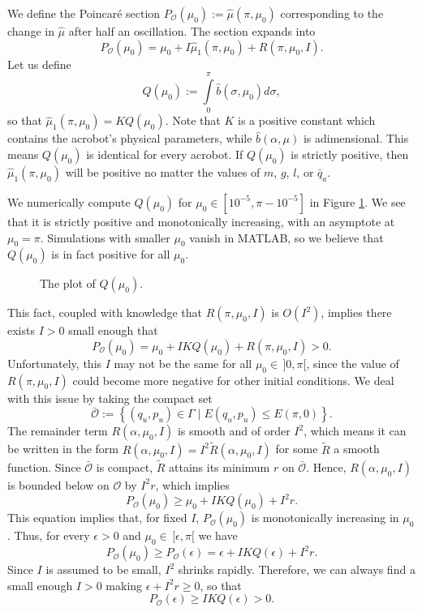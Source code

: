 We define the Poincar\'{e} section 
\(P_\mathcal{O}(\mu_0) := \hat{\mu}(\pi,\mu_0)\)
corresponding to the change in \(\hat{\mu}\) after half an oscillation.
The section expands into
\[
    P_\mathcal{O}(\mu_0) = \mu_0 + I \hat{\mu}_1(\pi,\mu_0) + R(\pi,\mu_0,I)
    .
\]
Let us define
\[
    Q(\mu_0) := \int \limits_0^\pi \hat{b}(\sigma,\mu_0)d\sigma
    ,
\]
so that \(\hat{\mu}_1(\pi,\mu_0) = K Q(\mu_0)\).
Note that \(K\) is a positive constant which contains the acrobot's physical
parameters, while \(\hat{b}(\alpha,\mu)\) is adimensional. 
This means \(Q(\mu_0)\) is identical for every acrobot.
If \(Q(\mu_0)\) is strictly positive, then \(\hat{\mu}_1(\pi,\mu_0)\) will be
positive no matter the values of \(m\), \(g\), \(l\), or \(\bar{q}_a\).

We numerically compute \(Q(\mu_0)\) for \(\mu_0 \in [10^{-5}, \pi - 10^{-5}]\)
in Figure \ref{fig:acrobot-Q}. 
We see that it is strictly positive and monotonically increasing, with
an asymptote at \(\mu_0 = \pi\). 
Simulations with smaller \(\mu_0\) vanish in MATLAB, so we believe that 
\(Q(\mu_0)\) is in fact positive for all \(\mu_0\).

\begin{figure}
    \centering
    \caption{The plot of \(Q(\mu_0)\).}
    \label{fig:acrobot-Q}
\end{figure}

This fact, coupled with knowledge that \(R(\pi,\mu_0,I)\) is \(O(I^2)\), 
implies there exists \(I > 0\) small enough that
\[
    P_\mathcal{O}(\mu_0) = \mu_0 + IKQ(\mu_0) + R(\pi,\mu_0,I) > 0
    .
\]
Unfortunately, this \(I\) may not be the
same for all \(\mu_0 \in \, ]0,\pi[\), since
the value of \(R(\pi,\mu_0,I)\) could become more negative
for other initial conditions.
We deal with this issue by taking the compact set
\[
    \bar{\mathcal{O}} := \left\{(q_u,p_u) \in \Gamma 
    \mid E(q_u,p_u) \leq E(\pi,0) \right\}
    .
\]
The remainder term \(R(\alpha,\mu_0,I)\) is smooth and of order \(I^2\),
which means it can be written in the form 
\(R(\alpha,\mu_0,I) = I^2\tilde{R}(\alpha,\mu_0,I)\)
for some \(\tilde{R}\) a smooth function.
Since \(\bar{\mathcal{O}}\) is compact, \(\tilde{R}\) attains its minimum
\({r}\) on \(\bar{\mathcal{O}}\).
Hence, \(R(\alpha,\mu_0,I)\) is bounded below on \(\mathcal{O}\) by
\(I^2{r}\), which implies 
\begin{equation}\label{eqn:acrobot-Po-lowerbound}
    P_\mathcal{O}(\mu_0) \geq \mu_0 + IKQ(\mu_0) + I^2{r}
    .
\end{equation}
This equation implies that, for fixed \(I\),
\(P_\mathcal{O}(\mu_0)\) is monotonically increasing in \(\mu_0\).
Thus, for every \(\epsilon > 0\) and \(\mu_0 \in \, [\epsilon,\pi[\) we have
\[
    P_\mathcal{O}(\mu_0) \geq P_\mathcal{O}(\epsilon)
    = \epsilon + IKQ(\epsilon) + I^2{r}
    .
\]
Since \(I\) is assumed to be small, \(I^2\) shrinks rapidly.
Therefore, we can always find a small enough \(I > 0\) making 
\(\epsilon + I^2{r} \geq 0\), so that
\[
    P_\mathcal{O}(\epsilon) \geq IKQ(\epsilon) > 0
    .
\]

